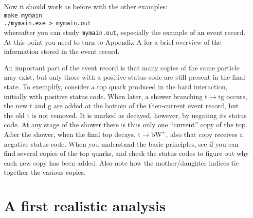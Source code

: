 \documentclass[12pt,a4paper]{article}
\renewcommand{\b}{{\mathrm b}}
\newcommand{\g}{{\mathrm g}}
\renewcommand{\t}{{\mathrm t}}
\newcommand{\W}{{\mathrm W}}
\begin{document}
Now it should work as before with the other examples:\\
\hspace*{10mm}\texttt{make mymain}\\
\hspace*{10mm}\texttt{./mymain.exe > mymain.out}\\
whereafter you can study \texttt{mymain.out}, especially the 
example of an event record. At this point you need to turn to Appendix A
for a brief overview of the information stored in the event record. 

An important part of the event record is that many copies of the same
particle may exist, but only those with a positive status code are still
present in the final state. To exemplify, consider a top quark
produced in the hard interaction, initially with positive status code. When
later, a shower branching $\t \to \t \g$ occurs, the new $\t$ and $\g$ are
added at the bottom of the then-current event record, but the old $\t$ is
not removed. It is marked as decayed, however, by negating its status code.
At any stage of the shower there is thus only one ``current'' copy of the
top. After the shower, when the final top decays, $\t \to \b \W^+$, also
that copy receives a negative status code. When you understand the basic
principles, see if you can find several copies of the top quarks, and check
the status codes to figure out why each new copy has been added. Also note
how the mother/daughter indices tie together the various copies.

\section{A first realistic analysis}
\end{document}
